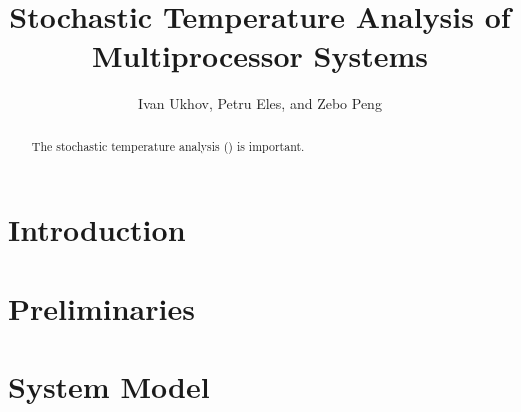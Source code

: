 \documentclass[conference]{IEEEtran}
\begin{document}
  \title{Stochastic Temperature Analysis of\\Multiprocessor Systems}
  \author{Ivan Ukhov, Petru Eles, and Zebo Peng}

  \author{
    \and
    \and
  }

  \maketitle

  \begin{abstract}
    The stochastic temperature analysis (\STempA) is important.
  \end{abstract}

  \section{Introduction} 
  

  \section{Preliminaries}
  

  \section{System Model}
  

  
  
\end{document}
